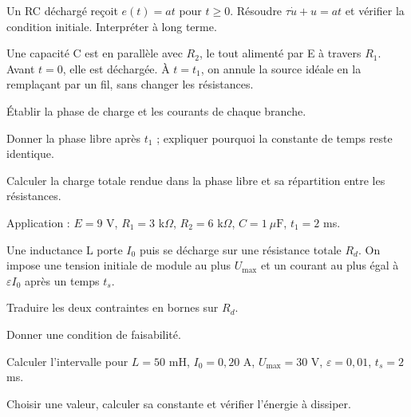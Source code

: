 \begin{questions}
\item Un RC déchargé reçoit $e(t)=at$ pour $t\geq0$. Résoudre $\tau\dot u+u=at$ et vérifier la condition initiale. Interpréter à long terme.
\end{questions}



\label{ch03-ex-D1}
Une capacité C est en parallèle avec $R_2$, le tout alimenté par E à travers $R_1$. Avant $t=0$, elle est déchargée. À $t=t_1$, on annule la source idéale en la remplaçant par un fil, sans changer les résistances.\begin{questions}
\item Établir la phase de charge et les courants de chaque branche.
\item Donner la phase libre après $t_1$ ; expliquer pourquoi la constante de temps reste identique.
\item Calculer la charge totale rendue dans la phase libre et sa répartition entre les résistances.
\item Application : $E=9$ V, $R_1=3$ k$\Omega$, $R_2=6$ k$\Omega$, $C=1\ \mu\mathrm{ F}$, $t_1=2$ ms.
\end{questions}


\label{ch03-ex-D2}
Une inductance L porte $I_0$ puis se décharge sur une résistance totale $R_d$. On impose une tension initiale de module au plus $U_{\max}$ et un courant au plus égal à $\varepsilon I_0$ après un temps $t_s$.\begin{questions}
\item Traduire les deux contraintes en bornes sur $R_d$.
\item Donner une condition de faisabilité.
\item Calculer l’intervalle pour $L=50$ mH, $I_0=0{,}20$ A, $U_{\max}=30$ V, $\varepsilon=0{,}01$, $t_s=2$ ms.
\item Choisir une valeur, calculer sa constante et vérifier l’énergie à dissiper.
\end{questions}


